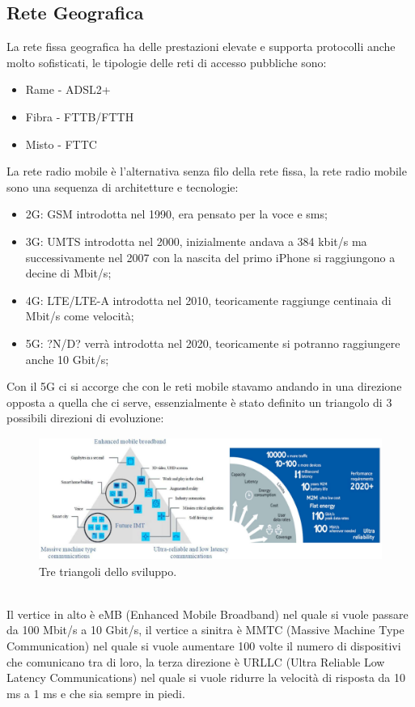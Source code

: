 \documentclass[11pt, twocolumn]{article}
\newenvironment{myitemize}
{ \begin{itemize}[topsep=0ex]
		\setlength{\itemsep}{0pt}
		\setlength{\parskip}{0pt}
		\setlength{\parsep}{0pt}     }
	{ \end{itemize}                  }
\begin{document}
\subsection{Rete Geografica}
La rete fissa geografica ha delle prestazioni elevate e supporta protocolli anche molto sofisticati, le tipologie delle reti di accesso pubbliche sono:
\begin{myitemize}
  \item Rame  - ADSL2+
  \item Fibra - FTTB/FTTH 
  \item Misto - FTTC
\end{myitemize}
La rete radio mobile è l'alternativa senza filo della rete fissa, la rete radio mobile sono una sequenza di architetture e tecnologie:
\begin{myitemize}
  \item 2G: GSM introdotta nel 1990, era pensato per la voce e sms;
  \item 3G: UMTS introdotta nel 2000, inizialmente andava a 384 kbit/s ma successivamente nel 2007 con la nascita del primo iPhone si raggiungono a decine di Mbit/s;
  \item 4G: LTE/LTE-A introdotta nel 2010, teoricamente raggiunge centinaia di Mbit/s come velocità;
  \item 5G: ?N/D? verrà introdotta nel 2020, teoricamente si potranno raggiungere anche 10 Gbit/s;
\end{myitemize}
Con il 5G ci si accorge che con le reti mobile stavamo andando in una direzione opposta a quella che ci serve, essenzialmente è stato definito un triangolo di 3 possibili direzioni di evoluzione:
\begin{figure}[!h]
  \centering
  \includegraphics[width=\linewidth,height=4cm]{imgs/5g.png}
  \caption{Tre triangoli dello sviluppo.}
  \label{fig:5g}
\end{figure}\\
Il vertice in alto è eMB (Enhanced Mobile Broadband) nel quale si vuole passare da 100 Mbit/s a 10 Gbit/s, il vertice a sinitra è MMTC (Massive Machine Type Communication) nel quale si vuole aumentare 100 volte il numero di dispositivi che comunicano tra di loro, la terza direzione è URLLC (Ultra Reliable Low Latency Communications) nel quale si vuole ridurre la velocità di risposta da 10 ms a 1 ms e che sia sempre in piedi.\\
\end{document}
